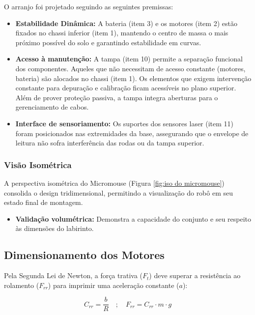 O arranjo foi projetado seguindo as seguintes premissas:

\begin{itemize}
    \item \textbf{Estabilidade Dinâmica:} A bateria (item 3) e os motores (item 2) estão fixados no chassi inferior (item 1), mantendo o centro de massa o mais próximo possível do solo e garantindo estabilidade em curvas.
    \item \textbf{Acesso à manutenção:} A tampa (item 10) permite a separação funcional dos componentes. Aqueles que não necessitam de acesso constante (motores, bateria) são alocados no chassi (item 1). Os elementos que exigem intervenção constante para depuração e calibração ficam acessíveis no plano superior. Além de prover proteção passiva, a tampa integra aberturas para o gerenciamento de cabos.
    \item \textbf{Interface de sensoriamento:} Os suportes dos sensores laser (item 11) foram posicionados nas extremidades da base, assegurando que o envelope de leitura não sofra interferência das rodas ou da tampa superior.
\end{itemize}

\subsubsection{Visão Isométrica}
A perspectiva isométrica do Micromouse (Figura \ref{fig:iso do micromouse}) consolida o design tridimensional, permitindo a visualização do robô em seu estado final de montagem.

\begin{itemize}
    \item \textbf{Validação volumétrica:} Demonstra a capacidade do conjunto e seu respeito às dimensões do labirinto.
\end{itemize}

\subsection{Dimensionamento dos Motores}

Pela Segunda Lei de Newton, a força trativa ($F_t$) deve superar a resistência ao rolamento ($F_{rr}$) para imprimir uma aceleração constante ($a$):

\begin{equation}
    C_{rr} = \frac{b}{R} \quad ; \quad F_{rr} = C_{rr} \cdot m \cdot g
\end{equation}

